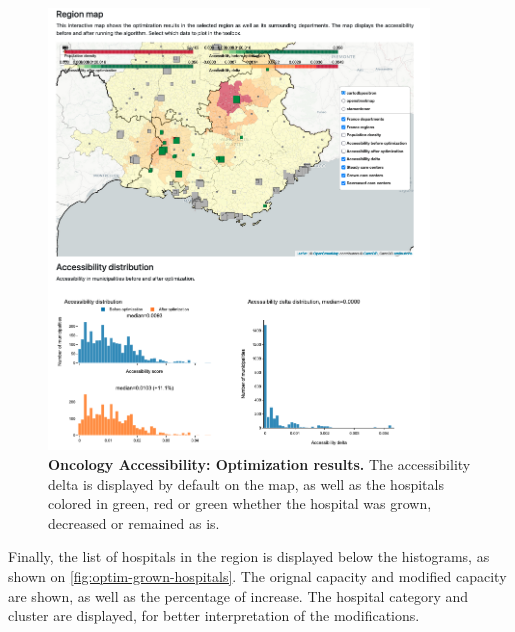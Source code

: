 \begin{figure}[H]
    \includegraphics[width=0.9\textwidth]{images/oncology-accessibility/optim-paca-map.png}
    \centering
    \caption{
        \textbf{Oncology Accessibility: Optimization results.}  The accessibility delta is displayed by default on the map, as well as the hospitals colored in green, red or green whether the hospital was grown, decreased or remained as is.
    }
    \label{fig:optim-results}
\end{figure}

Finally, the list of hospitals in the region is displayed below the histograms, as shown on \cref{fig:optim-grown-hospitals}. The orignal capacity and modified capacity are shown, as well as the percentage of increase. The hospital category and cluster are displayed, for better interpretation of the modifications.

